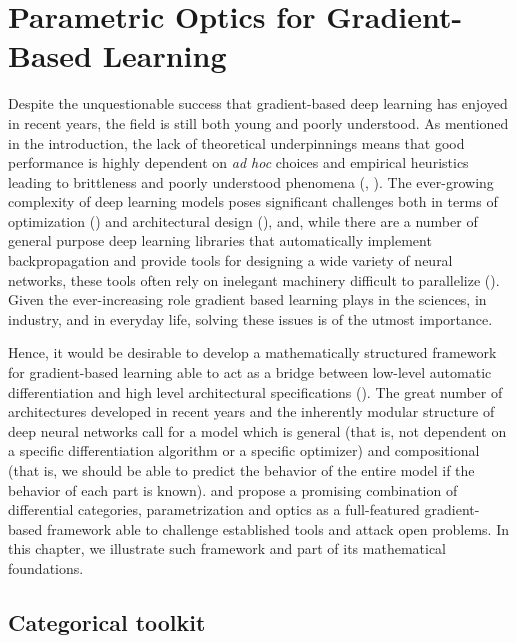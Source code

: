 \documentclass[11pt,a4paper,openright,twoside]{report}
\theoremstyle{plain}
\theoremstyle{definition}
\begin{document}

\chapter{Parametric Optics for Gradient-Based Learning}
\lhead[\fancyplain{}{\bfseries\thepage}]{\fancyplain{}{\bfseries\rightmark}}

Despite the unquestionable success that gradient-based deep learning has enjoyed in recent years, the field is still both young and poorly understood. As mentioned in the introduction, the lack of theoretical underpinnings means that good performance is highly dependent on \textit{ad hoc} choices and empirical heuristics leading to brittleness and poorly understood phenomena (\cite{shiebler2021category}, \cite{gavranovic2024fundamental}). The ever-growing complexity of deep learning models poses significant challenges both in terms of optimization (\cite{elliott2018simple}) and architectural design (\cite{gavranovicposition}), and, while there are a number of general purpose deep learning libraries that automatically implement backpropagation and provide tools for designing a wide variety of neural networks, these tools often rely on inelegant machinery difficult to parallelize (\cite{elliott2018simple}). Given the ever-increasing role gradient based learning plays in the sciences, in industry, and in everyday life, solving these issues is of the utmost importance. 

Hence, it would be desirable to develop a mathematically structured framework for gradient-based learning able to act as a bridge between low-level automatic differentiation and high level architectural specifications (\cite{gavranovic2024fundamental}). The great number of architectures developed in recent years and the inherently modular structure of deep neural networks call for a model which is general (that is, not dependent on a specific differentiation algorithm or a specific optimizer) and compositional (that is, we should be able to predict the behavior of the entire model if the behavior of each part is known). \cite{cruttwell2022categorical} and \cite{gavranovic2024fundamental} propose a promising combination of differential categories, parametrization and optics as a full-featured gradient-based framework able to challenge established tools and attack open problems. In this chapter, we illustrate such framework  and part of its mathematical foundations. 

\section{Categorical toolkit}
\end{document}
